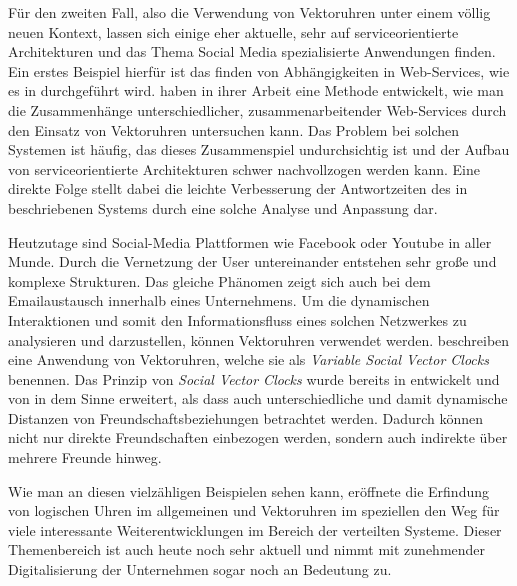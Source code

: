 Für den zweiten Fall, also die Verwendung von Vektoruhren unter einem völlig neuen Kontext, lassen sich einige eher aktuelle, sehr auf serviceorientierte Architekturen und das Thema Social Media spezialisierte Anwendungen finden.
Ein erstes Beispiel hierfür ist das finden von Abhängigkeiten in Web-Services, wie es in \cite{Romano2011} durchgeführt wird.  haben in ihrer Arbeit eine Methode entwickelt, wie man die Zusammenhänge unterschiedlicher, zusammenarbeitender Web-Services durch den Einsatz von Vektoruhren untersuchen kann. Das Problem bei solchen Systemen ist häufig, das dieses Zusammenspiel undurchsichtig ist und der Aufbau von serviceorientierte Architekturen schwer nachvollzogen werden kann. Eine direkte Folge stellt dabei die leichte Verbesserung der Antwortzeiten des in \cite{Romano2011} beschriebenen Systems durch eine solche Analyse und Anpassung dar.

Heutzutage sind Social-Media Plattformen wie Facebook oder Youtube in aller Munde. Durch die Vernetzung der User untereinander entstehen sehr große und komplexe Strukturen. Das gleiche Phänomen zeigt sich auch bei dem Emailaustausch innerhalb eines Unternehmens. Um die dynamischen Interaktionen und somit den Informationsfluss eines solchen Netzwerkes zu analysieren und darzustellen, können Vektoruhren verwendet werden.  \cite{Hsu2014} beschreiben eine Anwendung von Vektoruhren, welche sie als \textit{Variable Social Vector Clocks} benennen. Das Prinzip von \textit{Social Vector Clocks} wurde bereits in \cite{Kossinets2008} entwickelt und von  in dem Sinne erweitert, als dass auch unterschiedliche und damit dynamische Distanzen von Freundschaftsbeziehungen betrachtet werden. Dadurch können nicht nur direkte Freundschaften einbezogen werden, sondern auch indirekte über mehrere Freunde hinweg.

Wie man an diesen vielzähligen Beispielen sehen kann, eröffnete die Erfindung von logischen Uhren im allgemeinen und Vektoruhren im speziellen den Weg für viele interessante Weiterentwicklungen im Bereich der verteilten Systeme. Dieser Themenbereich ist auch heute noch sehr aktuell und nimmt mit zunehmender Digitalisierung der Unternehmen sogar noch an Bedeutung zu.